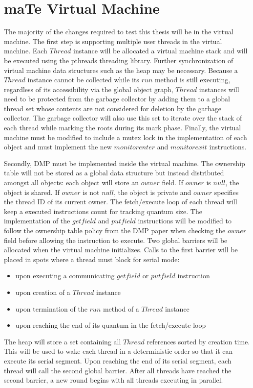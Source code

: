 \section{maTe Virtual Machine}

The majority of the changes required to test this thesis will be in
the virtual machine.  The first step is supporting multiple user
threads in the virtual machine.  Each $Thread$ instance will be
allocated a virtual machine stack and will be executed using the
pthreads threading library.  Further synchronization of virtual
machine data structures such as the heap may be necessary.  Because a
$Thread$ instance cannot be collected while its $run$ method is still
executing, regardless of its accessibility via the global object
graph, $Thread$ instances will need to be protected from the garbage
collector by adding them to a global thread set whose contents are not
considered for deletion by the garbage collector.  The garbage
collector will also use this set to iterate over the stack of each
thread while marking the roots during its mark phase.  Finally, the
virtual machine must be modified to include a mutex lock in the
implementation of each object and must implement the new
$monitorenter$ and $monitorexit$ instructions.

Secondly, DMP must be implemented inside the virtual machine.  The
ownership table will not be stored as a global data structure but
instead distributed amongst all objects: each object will store an
$owner$ field.  If $owner$ is $null$, the object is shared.  If
$owner$ is not $null$, the object is private and $owner$ specifies the
thread ID of its current owner.  The fetch/execute loop of each thread
will keep a executed instructions count for tracking quantum size.
The implementation of the $getfield$ and $putfield$ instructions will
be modified to follow the ownership table policy from the DMP paper
when checking the $owner$ field before allowing the instruction to
execute.  Two global barriers will be allocated when the virtual
machine initializes.  Calls to the first barrier will be placed in
spots where a thread must block for serial mode:

\begin{itemize}
\item upon executing a communicating $getfield$ or $putfield$
  instruction
\item upon creation of a $Thread$ instance
\item upon termination of the $run$ method of a $Thread$ instance
\item upon reaching the end of its quantum in the fetch/execute loop
\end{itemize}

The heap will store a set containing all $Thread$ references sorted by
creation time.  This will be used to wake each thread in a
deterministic order so that it can execute its serial segment.  Upon
reaching the end of its serial segment, each thread will call the
second global barrier.  After all threads have reached the second
barrier, a new round begins with all threads executing in parallel.
